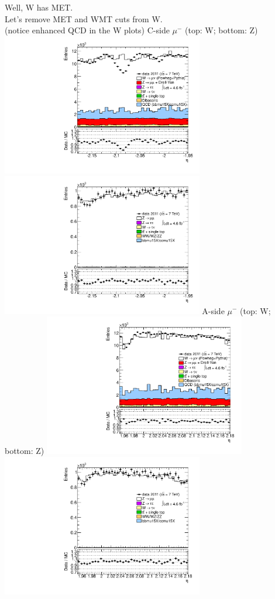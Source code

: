  {
Well, W has MET. \\
Let's remove MET and WMT cuts from W. \\
(notice enhanced QCD in the W plots)
}
 {
\colb[T]
C-side $\mu^{-}$ (top: W; bottom: Z)
\centering
\includegraphics[width=0.66\textwidth]{dates/20130306/figures/etaphi/Wnometmt_10_C_stack_l_eta_NEG} \\
\includegraphics[width=0.66\textwidth]{dates/20130306/figures/etaphi/Z_10_C_stack_lN_eta_ALL.pdf}
A-side $\mu^{-}$ (top: W; bottom: Z)
\centering
\includegraphics[width=0.66\textwidth]{dates/20130306/figures/etaphi/Wnometmt_10_A_stack_l_eta_NEG} \\
\includegraphics[width=0.66\textwidth]{dates/20130306/figures/etaphi/Z_10_A_stack_lN_eta_ALL.pdf} 
\cole
}

